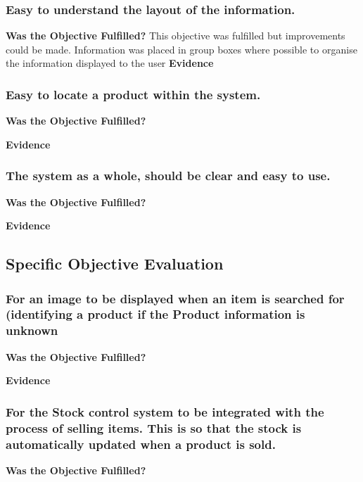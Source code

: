 \subsubsection{Easy to understand the layout of the information.}
\textbf{Was the Objective Fulfilled?} \newline
This objective was fulfilled but improvements could be made. Information was placed in group boxes where possible to organise the information displayed to the user
\textbf{Evidence} \newline




\subsubsection{Easy to locate a product within the system.}
\textbf{Was the Objective Fulfilled?} \newline

\textbf{Evidence} \newline





\subsubsection{The system as a whole, should be clear and easy to use.}
\textbf{Was the Objective Fulfilled?} \newline

\textbf{Evidence} \newline





\subsection{Specific Objective Evaluation}

\subsubsection{For an image to be displayed when an item is searched for (identifying a product if the Product information is unknown}
\textbf{Was the Objective Fulfilled?} \newline

\textbf{Evidence} \newline





\subsubsection{For the Stock control system to be integrated with the process of selling items. This is so that the stock is automatically updated when a product is sold.}
\textbf{Was the Objective Fulfilled?} \newline

